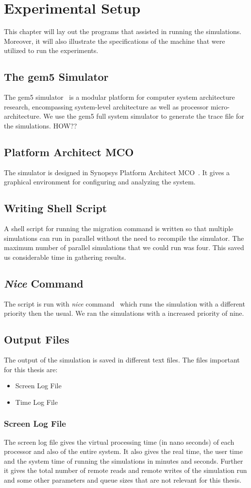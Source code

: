 \documentclass{listhesis}
\begin{document}
\chapter{Experimental Setup}
This chapter will lay out the programs that assisted in running the simulations. Moreover, it will also illustrate the specifications of the machine that were utilized to run the experiments.
\section{The gem5 Simulator}
The gem5 simulator~\cite{gem5} is a modular platform for computer system architecture research, encompassing system-level architecture as well as processor micro-architecture. We use the gem5 full system simulator to generate the trace file for the simulations. HOW??
\section{Platform Architect MCO}
The simulator is designed in Synopsys Platform Architect MCO~\cite{synopsys}. It gives a graphical environment for configuring and analyzing the system. 
\section{Writing Shell Script}
A shell script for running the migration command is written so that multiple simulations can run in parallel without the need to recompile the simulator. The maximum number of parallel simulations that we could run was four. This saved us considerable time in gathering results. 
\section{\textit{Nice} Command}
The script is run with \textit{nice} command~\cite{nice} which runs the simulation with a different priority then the usual. We ran the simulations with a increased priority of nine.
\section{Output Files}
The output of the simulation is saved in different text files. The files important for this thesis are:
\begin{itemize}
\item Screen Log File
\item Time Log File
\end{itemize}
\subsection{Screen Log File}
The screen log file gives the virtual processing time (in nano seconds) of each processor and also of the entire system. It also gives the real time, the user time and the system time of running the simulations in minutes and seconds. Further it gives the total number of remote reads and remote writes of the simulation run and some other parameters and queue sizes that are not relevant for this thesis.\\
\end{document}

